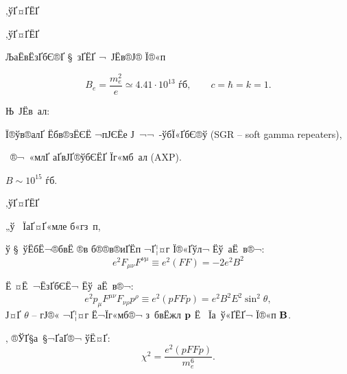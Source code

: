 
\def\F{\mbox{\tiny F}}

\begin{Slide}{‚ўҐ¤Ґ­ЁҐ} 

\vspace*{10mm}

\begin{center}

{\red\LARGE ‚ўҐ¤Ґ­ЁҐ}

\vspace*{10mm}

{\blue ЉаЁвЁзҐбЄ®Ґ §­ зҐ­ЁҐ ¬ Ј­Ёв­®Ј® Ї®«п}

$$B_e = \frac{m_e^2}{e}\simeq 4.41\cdot 10^{13}\,\, \mbox{ѓб}, 
\qquad c = \hbar = k = 1.$$

\vspace*{5mm}

Њ Ј­Ёв ал: 
 
Ї®ўв®а­лҐ Ёбв®з­ЁЄЁ ¬пЈЄЁе Ј ¬¬ -ўбЇ«ҐбЄ®ў 
(SGR -- soft gamma repeaters), 

 ­®¬ «м­лҐ аҐ­вЈҐ­®ўбЄЁҐ Їг«мб ал (AXP).

\vspace*{5mm}

{\red $B \sim 10^{15}$ ѓб}.  


\end{center}

\end{Slide}


\begin{Slide}{‚ўҐ¤Ґ­ЁҐ} 

\vspace*{5mm}

\begin{center}

\centerline{\darkgreen „ў  ЇаҐ¤Ґ«м­ле б«гз п,}

\vspace*{5mm}

\noindent
ў § ўЁбЁ¬®бвЁ ®в б®®в­®иҐ­Ёп ¬Ґ¦¤г Ї®«Ґўл¬ Ё­ў аЁ ­в®¬: 
%
$$e^2 F_{\mu \nu} F^{\nu \mu} \equiv e^2 (F F) = - 2 e^2 B^2$$

\noindent
Ё ¤Ё­ ¬ЁзҐбЄЁ¬ Ё­ў аЁ ­в®¬:
%
$$e^2 p_\mu F^{\mu \nu} F_{\nu \rho} p^\rho \equiv e^2 (p F F p) 
= e^2 B^2 E^2 \sin^2 \theta, $$
%
Ј¤Ґ $\theta$ -- гЈ®« ¬Ґ¦¤г Ё¬Їг«мб®¬ з бвЁжл $\bf p$ Ё ­ Їа ў«Ґ­ЁҐ¬ 
Ї®«п $\bf B$. 

‚ ®ЎҐ§а §¬ҐаҐ­­®¬ ўЁ¤Ґ:
%
$$\chi^2 = \frac{e^2 (p F F p)}{m_e^6} .$$

\end{center}

\end{Slide}

